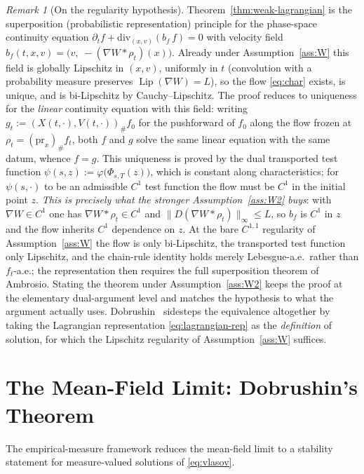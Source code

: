 \documentclass[11pt]{article}
\theoremstyle{definition}
\theoremstyle{remark}
\newtheorem{remark}[theorem]{Remark}
\DeclareMathOperator{\Lip}{Lip}
\begin{document}
\begin{remark}[On the regularity hypothesis]\label{rem:weak-lagrangian-reg}
Theorem~\ref{thm:weak-lagrangian} is the superposition (probabilistic representation)
principle for the phase-space continuity equation
$\partial_t f + \mathrm{div}_{(x,v)}(b_f\, f) = 0$ with velocity field
$b_f(t,x,v) = \big( v,\; -(\nabla W * \rho_t)(x) \big)$. Already under
Assumption~\ref{ass:W} this field is globally Lipschitz in $(x,v)$, uniformly in $t$
(convolution with a probability measure preserves $\Lip(\nabla W) = L$), so the flow
\eqref{eq:char} exists, is unique, and is bi-Lipschitz by Cauchy--Lipschitz. The proof
reduces to uniqueness for the \emph{linear} continuity equation with this field: writing
$g_t := (X(t,\cdot), V(t,\cdot))_\# f_0$ for the pushforward of $f_0$ along the flow frozen
at $\rho_t = (\mathrm{pr}_x)_\# f_t$, both $f$ and $g$ solve the same linear equation with
the same datum, whence $f = g$. This uniqueness is proved by the dual transported test
function $\psi(s,z) := \varphi\big(\Phi_{s,T}(z)\big)$, which is constant along
characteristics; for $\psi(s,\cdot)$ to be an admissible $C^1$ test function the flow must
be $C^1$ in the initial point $z$. \emph{This is precisely what the stronger
Assumption~\ref{ass:W2} buys}: with $\nabla W \in C^1$ one has $\nabla W * \rho_t \in C^1$
and $\|D(\nabla W * \rho_t)\|_\infty \le L$, so $b_f$ is $C^1$ in $z$ and the flow inherits
$C^1$ dependence on $z$. At the bare $C^{1,1}$ regularity of Assumption~\ref{ass:W} the flow
is only bi-Lipschitz, the transported test function only Lipschitz, and the chain-rule
identity holds merely Lebesgue-a.e.\ rather than $f_t$-a.e.; the representation then requires
the full superposition theorem of Ambrosio. Stating the theorem under
Assumption~\ref{ass:W2} keeps the proof at the elementary dual-argument level and matches
the hypothesis to what the argument actually uses. Dobrushin~\cite{Dobrushin} sidesteps the
equivalence altogether by taking the Lagrangian representation \eqref{eq:lagrangian-rep} as
the \emph{definition} of solution, for which the Lipschitz regularity of
Assumption~\ref{ass:W} suffices.
\end{remark}

\section{The Mean-Field Limit: Dobrushin's Theorem}

The empirical-measure framework reduces the mean-field limit to a stability statement for
measure-valued solutions of \eqref{eq:vlasov}.
\end{document}
